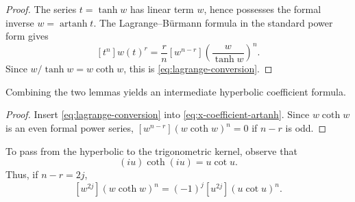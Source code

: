 \documentclass[11pt,twoside]{article}
\begin{document}
\begin{proof}
The series $t=\tanh w$ has linear term $w$, hence possesses the formal
inverse $w=\operatorname{artanh}t$.  The Lagrange--B\"urmann formula in
the standard power form gives
\[
[t^n]w(t)^r
=\frac{r}{n}[w^{n-r}]
\left(\frac{w}{\tanh w}\right)^n.
\]
Since $w/\tanh w=w\coth w$, this is
\eqref{eq:lagrange-conversion}.
\end{proof}

Combining the two lemmas yields an intermediate hyperbolic coefficient
formula.


\begin{proof}
Insert \eqref{eq:lagrange-conversion} into
\eqref{eq:x-coefficient-artanh}.  Since $w\coth w$ is an even formal
power series, $[w^{n-r}](w\coth w)^n=0$ if $n-r$ is odd.
\end{proof}

To pass from the hyperbolic to the trigonometric kernel, observe that
\begin{equation}
\label{eq:coth-cot-analytic-continuation}
(iu)\coth(iu)=u\cot u.
\end{equation}
Thus, if $n-r=2j$,
\begin{equation}
\label{eq:coth-cot-coefficients}
[w^{2j}](w\coth w)^n
=(-1)^j[u^{2j}](u\cot u)^n.
\end{equation}

\end{document}
